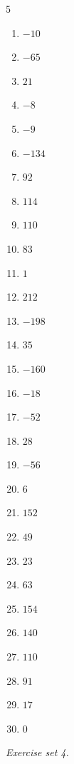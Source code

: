 \begin{multicols}{5}\raggedright
\begin{enumerate}[label=\arabic*., leftmargin=*, itemsep=1pt]
\item $-10$
\item $-65$
\item $21$
\item $-8$
\item $-9$
\item $-134$
\item $92$
\item $114$
\item $110$
\item $83$
\item $1$
\item $212$
\item $-198$
\item $35$
\item $-160$
\item $-18$
\item $-52$
\item $28$
\item $-56$
\item $6$
\item $152$
\item $49$
\item $23$
\item $63$
\item $154$
\item $140$
\item $110$
\item $91$
\item $17$
\item $0$
\end{enumerate}
\end{multicols}
\par\noindent\emph{Exercise set 4.}\nopagebreak
